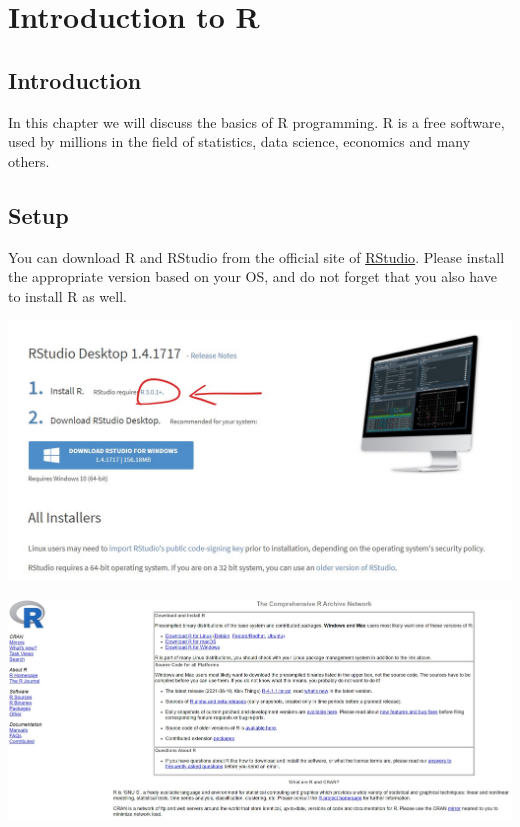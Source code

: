 \documentclass[
]{article}
\begin{document}
\hypertarget{seminar1}{%
\section{Introduction to R}\label{seminar1}}

\hypertarget{introduction}{%
\subsection{Introduction}\label{introduction}}

In this chapter we will discuss the basics of R programming.
R is a free software, used by millions in the field of statistics, data science, economics and many others.

\hypertarget{layout}{%
\subsection{Setup}\label{layout}}

You can download R and RStudio from the official site of \href{https://www.rstudio.com/products/rstudio/download/\#download}{RStudio}.
Please install the appropriate version based on your OS, and do not forget that you also have to install R as well.

\href{https://www.rstudio.com/products/rstudio/download/\#download}{\includegraphics[width=6.25in,height=\textheight]{images/installr.jpg}}

\href{https://cran.rstudio.com/}{\includegraphics[width=6.25in,height=\textheight]{images/installr2.jpg}}
\end{document}
